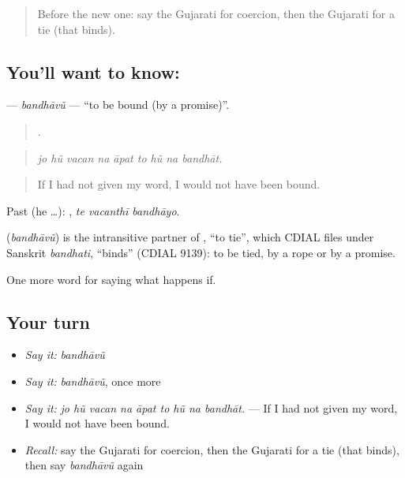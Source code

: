 \label{lesson:GU-C540-bandhavu}



\begin{quote}
Before the new one: say the Gujarati for coercion, then the Gujarati for a tie (that binds).
\end{quote}

\subsection*{You'll want to know: }
\textbf{} — \emph{bandhāvũ} — \textquotedblleft{}to be bound (by a promise)\textquotedblright{}.

\begin{quote}
        .
\end{quote}

\begin{quote}
\emph{jo hũ vacan na āpat to hũ na bandhāt.}
\end{quote}

\begin{quote}
If I had not given my word, I would not have been bound.
\end{quote}

Past (he …):   , \emph{te vacanthī bandhāyo}.

\begin{cousinweb}
\textbf{} (\emph{bandhāvũ}) is the intransitive partner of \textbf{}, \textquotedblleft{}to tie\textquotedblright{}, which CDIAL files under Sanskrit \emph{bandhati}, \textquotedblleft{}binds\textquotedblright{} (CDIAL 9139): to be tied, by a rope or by a promise.
\end{cousinweb}

\begin{grammarlens}[title={What you've built}]
One more word for saying what happens if.
\end{grammarlens}

\subsection*{Your turn}
\begin{itemize}
\raggedright
  \item \emph{Say it:} \emph{bandhāvũ}
  \item \emph{Say it:} \emph{bandhāvũ}, once more
  \item \emph{Say it:} \emph{jo hũ vacan na āpat to hũ na bandhāt.} — If I had not given my word, I would not have been bound.
  \item \emph{Recall:} say the Gujarati for coercion, then the Gujarati for a tie (that binds), then say \emph{bandhāvũ} again
\end{itemize}

